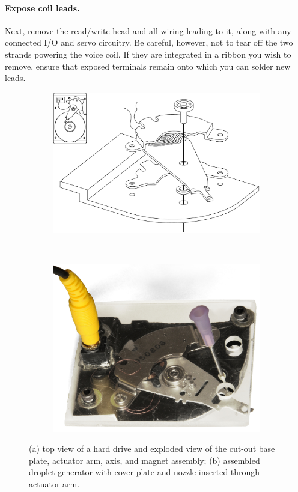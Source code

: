 \documentclass[11.5pt]{book}
\begin{document}
\paragraph{Expose coil leads.} Next, remove the read/write head and all
wiring leading to it, along with any connected I/O and servo circuitry. Be
careful, however, not to tear off the two strands powering the voice coil. If
they are integrated in a ribbon you wish to remove, ensure that exposed
terminals remain onto which you can solder new leads.
\begin{figure}
\centering
        \begin{subfigure}[b]{0.45\textwidth}
            \includegraphics[width=\textwidth]{img/setup/dropletgenerator_exploded.pdf}
            \caption{\label{fig:harddrive-photo}}
        \end{subfigure}~\begin{subfigure}[b]{0.45\textwidth}
            \includegraphics[width=\textwidth]{img/setup/designpicture.jpg}
            \caption{\label{fig:designschematic}}
        \end{subfigure}
        \caption{(a) top view of a hard drive and exploded view of the cut-out base
        plate, actuator arm, axis, and magnet assembly; (b) assembled droplet
    generator with cover plate and nozzle inserted through actuator arm.}
\end{figure}
\end{document}
